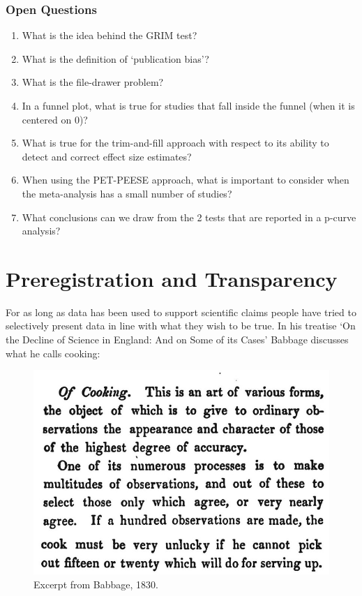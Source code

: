 \documentclass[
  oneside]{book}
\begin{document}
\hypertarget{open-questions-10}{%
\subsection{Open Questions}\label{open-questions-10}}

\begin{enumerate}
\def\labelenumi{\arabic{enumi}.}
\item
  What is the idea behind the GRIM test?
\item
  What is the definition of `publication bias'?
\item
  What is the file-drawer problem?
\item
  In a funnel plot, what is true for studies that fall inside the funnel (when it is centered on 0)?
\item
  What is true for the trim-and-fill approach with respect to its ability to detect and correct effect size estimates?
\item
  When using the PET-PEESE approach, what is important to consider when the meta-analysis has a small number of studies?
\item
  What conclusions can we draw from the 2 tests that are reported in a p-curve analysis?
\end{enumerate}

\hypertarget{prereg}{%
\chapter{Preregistration and Transparency}\label{prereg}}

For as long as data has been used to support scientific claims people have tried to selectively present data in line with what they wish to be true. In his treatise `On the Decline of Science in England: And on Some of its Cases' Babbage \citet{babbage_reflections_1830} discusses what he calls cooking:



\begin{figure}

{\centering \includegraphics[width=1\linewidth]{images/babbage} 

}

\caption{Excerpt from Babbage, 1830.}\label{fig:babbage}
\end{figure}
\end{document}
